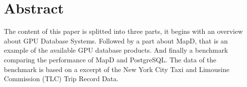\chapter*{Abstract}
The content of this paper is splitted into three parts, it begins with an overview about GPU Database Systems.
Followed by a part about MapD, that is an example of the available GPU database products.
And finally a benchmark comparing the performance of MapD and PostgreSQL.
The data of the benchmark is based on a excerpt of the New York City Taxi and Limousine Commission (TLC) Trip Record Data.